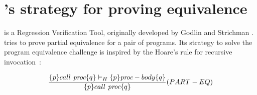 \label{sec:RVTreview}
\section{'s strategy for proving equivalence}
 is a Regression Verification Tool, originally developed by Godlin and Strichman \cite{DBLP:conf/dac/GodlinS09}.  tries to prove partial equivalence for a pair of programs. Its strategy to solve the program equivalence challenge is inspired by the Hoare's rule for recursive invocation~\cite{DBLP:series/lnm/Hoare71}: 

\begin{equation} \label{eqn:parteq}
 {\frac {\{p\} call\ \emph{proc} \{q\} \vdash_H \{p\} \emph{proc}-body \{q\}}{\{p\} call\ \emph{proc} \{q\}}} 
  (PART-EQ) 
\end{equation}

